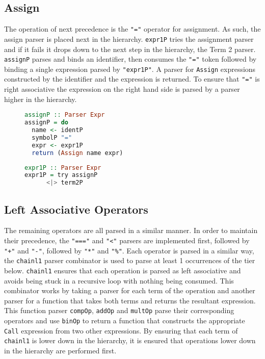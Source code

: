 \documentclass{article}
\begin{document}
\subsection{Assign}
The operation of next precedence is the \texttt{"="} operator for assignment. As such, the assign parser is placed next in the hierarchy. \texttt{expr1P} tries the assignment parser and if it fails it drops down to the next step in the hierarchy, the Term 2 parser. \texttt{assignP} parses and binds an identifier, then consumes the \texttt{"="} token followed by binding a single expression parsed by \texttt{"expr1P"}. A parser for \texttt{Assign} expressions constructed by the identifier and the expression is returned. To ensure that \texttt{"="} is right associative the expression on the right hand side is parsed by a parser higher in the hierarchy.

\begin{figure}[h!]
\begin{minipage}{0.5\textwidth}
\begin{lstlisting}[language=Haskell]
assignP :: Parser Expr
assignP = do
  name <- identP
  symbolP "="
  expr <- expr1P
  return (Assign name expr)
\end{lstlisting}
\end{minipage}
\begin{minipage}{0.5\textwidth}
\begin{lstlisting}[language=Haskell]
expr1P :: Parser Expr
expr1P = try assignP
      <|> term2P
\end{lstlisting}
\end{minipage}
\end{figure}
\subsection{Left Associative Operators}
The remaining operators are all parsed in a similar manner. In order to maintain their precedence, the \texttt{"==="} and \texttt{"<"} parsers are implemented first, followed by \texttt{"+"} and \texttt{"-"}, followed by \texttt{"*"} and \texttt{"\%"}. Each operator is parsed in a similar way, the \texttt{chainl1} parser combinator is used to parse at least 1 occurrences of the tier below. \texttt{chainl1} ensures that each operation is parsed as left associative and avoids being stuck in a recursive loop with nothing being consumed. This combinator works by taking a parser for each term of the operation and another parser for a function that takes both terms and returns the resultant expression. This function parser \texttt{compOp}, \texttt{addOp} and \texttt{multOp} parse their corresponding operators and use \texttt{binOp} to return a function that constructs the appropriate \texttt{Call} expression from two other expressions. By ensuring that each term of \texttt{chainl1} is lower down in the hierarchy, it is ensured that operations lower down in the hierarchy are performed first.
\end{document}
